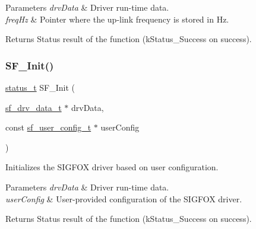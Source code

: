 \begin{DoxyParams}{Parameters}
{\em drv\+Data} & Driver run-\/time data. \\
\hline
{\em freq\+Hz} & Pointer where the up-\/link frequency is stored in Hz.\\
\hline
\end{DoxyParams}
\begin{DoxyReturn}{Returns}
Status result of the function (k\+Status\+\_\+\+Success on success). 
\end{DoxyReturn}
\mbox{\label{group__sf__functions__group_gada7c9026ce05c5baaf767bfa10928039}} 
\subsubsection{\texorpdfstring{SF\_Init()}{SF\_Init()}}
{\footnotesize\ttfamily \mbox{\hyperlink{group__ksdk__common_gaaabdaf7ee58ca7269bd4bf24efcde092}{status\+\_\+t}} S\+F\+\_\+\+Init (\begin{DoxyParamCaption}\item[{\mbox{\hyperlink{structsf__drv__data__t}{sf\+\_\+drv\+\_\+data\+\_\+t}} $\ast$}]{drv\+Data,  }\item[{const \mbox{\hyperlink{structsf__user__config__t}{sf\+\_\+user\+\_\+config\+\_\+t}} $\ast$}]{user\+Config }\end{DoxyParamCaption})}



Initializes the S\+I\+G\+F\+OX driver based on user configuration. 


\begin{DoxyParams}{Parameters}
{\em drv\+Data} & Driver run-\/time data. \\
\hline
{\em user\+Config} & User-\/provided configuration of the S\+I\+G\+F\+OX driver.\\
\hline
\end{DoxyParams}
\begin{DoxyReturn}{Returns}
Status result of the function (k\+Status\+\_\+\+Success on success). 
\end{DoxyReturn}
\mbox{\label{group__sf__functions__group_ga1aa190c9d68ca42596579425130183b2}} 
